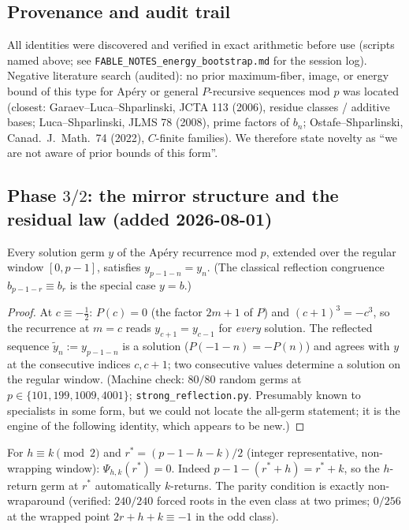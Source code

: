 \subsection{Provenance and audit trail}

All identities were discovered and verified in exact arithmetic before use
(scripts named above; see \texttt{FABLE\_NOTES\_energy\_bootstrap.md} for the
session log).  Negative literature search (audited): no prior maximum-fiber,
image, or energy bound of this type for Ap\'ery or general $P$-recursive
sequences mod $p$ was located
(closest: Garaev--Luca--Shparlinski, JCTA 113 (2006), residue classes /
additive bases; Luca--Shparlinski, JLMS 78 (2008), prime factors of $b_n$;
Ostafe--Shparlinski, Canad.\ J.\ Math.\ 74 (2022), $C$-finite families).
We therefore state novelty as ``we are not aware of prior bounds of this
form''.

\subsection{Phase $3/2$: the mirror structure and the residual law
(added 2026-08-01)}

\begin{theorem}\label{thm:strongrefl}
Every solution germ $y$ of the Ap\'ery recurrence mod $p$, extended over the
regular window $[0,p-1]$, satisfies $y_{p-1-n}=y_n$.  (The classical reflection
congruence $b_{p-1-r}\equiv b_r$ is the special case $y=b$.)
\end{theorem}

\begin{proof}
At $c\equiv-\tfrac12$: $P(c)=0$ (the factor $2m+1$ of $P$) and
$(c+1)^3=-c^3$, so the recurrence at $m=c$ reads $y_{c+1}=y_{c-1}$ for
\emph{every} solution.  The reflected sequence $\tilde y_n:=y_{p-1-n}$ is a
solution ($P(-1-n)=-P(n)$) and agrees with $y$ at the consecutive indices
$c,c+1$; two consecutive values determine a solution on the regular window.
(Machine check: $80/80$ random germs at $p\in\{101,199,1009,4001\}$;
\texttt{strong\_reflection.py}.  Presumably known to specialists in some form,
but we could not locate the all-germ statement; it is the engine of the
following identity, which appears to be new.)
\end{proof}

\begin{corollary}\label{cor:mirror}
For $h\equiv k\pmod 2$ and $r^*=(p-1-h-k)/2$ (integer representative,
non-wrapping window): $\Psi_{h,k}(r^*)=0$.  Indeed $p-1-(r^*+h)=r^*+k$, so the
$h$-return germ at $r^*$ automatically $k$-returns.  The parity condition is
exactly non-wraparound (verified: $240/240$ forced roots in the even class at
two primes; $0/256$ at the wrapped point $2r+h+k\equiv-1$ in the odd class).
\end{corollary}

